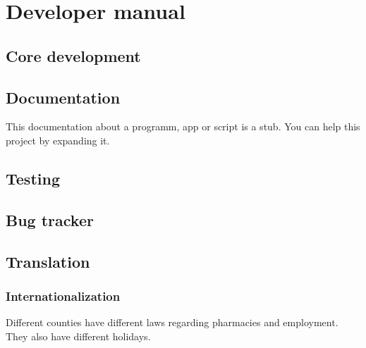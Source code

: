 
\chapter{Developer manual}
\section{Core development}
\section{Documentation}
This documentation about a programm, app or script is a stub. You can help this project by expanding it.

\section{Testing}
\section{Bug tracker}
\section{Translation}
\subsection{Internationalization}
Different counties have different laws regarding pharmacies and employment. They also have different holidays.

